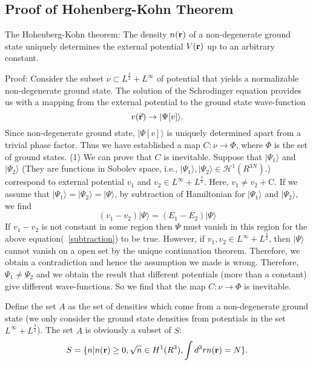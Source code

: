 \chapter{}\label{CHAPETR_A}
\section{Proof of Hohenberg-Kohn Theorem} \label{proof_HK}
The Hohenberg-Kohn theorem: The density $n({\bf r})$ of a non-degenerate ground state uniquely determines the external potential $V({\bf r})$ up to an arbitrary constant.

Proof:
Consider the subset $\mathscr{\nu}\subset L^{\frac{3}{2}}+L^{\infty}$ of potential that yields a normalizable non-degenerate ground state. The solution of the Schrodinger equation provides us with a mapping from the external potential to the ground state wave-function
\begin{equation}
 v(\vec {\bf r})\rightarrow |\Psi[v]\rangle.
\end{equation}
Since non-degenerate ground state, $|\Psi[v]\rangle$ is uniquely determined apart from a trivial phase factor.
Thus we have established a map $C: \mathscr{\nu}\rightarrow \Phi$, where $\Phi$ is the set of ground states.
(1) We can prove that $C$ is inevitable. Suppose that $|\Psi_1\rangle$ and $|\Psi_2\rangle$ (They are functions in Sobolev space, i.e.,  $|\Psi_1\rangle, |\Psi_2\rangle \in \mathscr{H}^1(R^{3N})$.) correspond to external potential $v_1$ and $v_2 \in L^{\infty}+L^{\frac{3}{2}}$. Here, $v_1 \neq v_2+\text{C}$. If we assume that $|\Psi_1\rangle=|\Psi_2\rangle=|\Psi\rangle$, by subtraction of Hamiltonian for  $|\Psi_1\rangle$ and $|\Psi_2\rangle$, we find
\begin{equation}
 (v_1-v_2)|\Psi\rangle = (E_1-E_2)|\Psi\rangle
\label{subtraction}
 \end{equation}
If $v_1-v_2$ is  not constant in some region then $\Psi$ must vanish in this region for the above equation(~\ref{subtraction})
to be true. However, if $v_1, v_2 \in L^{\infty}+L^{\frac{3}{2}}$, then $|\Psi\rangle$ cannot vanish on a open set by the unique continuation theorem. Therefore, we obtain a contradiction and hence the assumption we made is wrong. Therefore, $\Psi_1 \neq \Psi_2$ and we obtain the result that different potentials (more than a constant) give different wave-functions.  So we find that the map $C: \mathscr{\nu}\rightarrow \Phi$ is inevitable.

Define the set $A$ as the set of densities which come from a non-degenerate ground state (we only consider the ground 
state densities from potentials in the set $L^{\infty}+L^{\frac{3}{2}}$). The set $A$ is obviously a subset of $S$:
\begin{equation}
S=\{n|n({\bf r})\geq0, \sqrt{n}\in H^1(R^3), \int d^3rn({\bf r})=N\} .
\end{equation}

